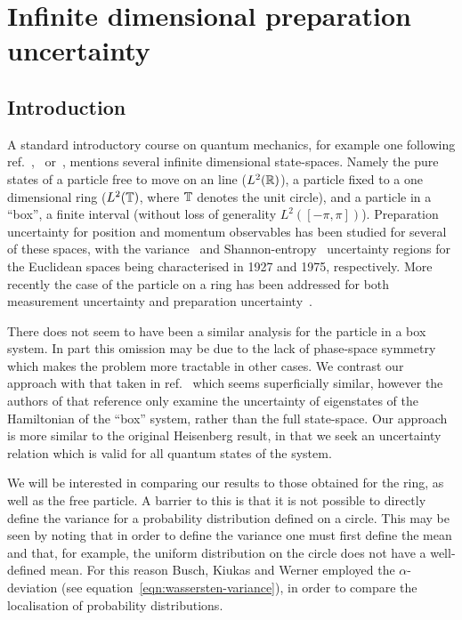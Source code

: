 \chapter{Infinite dimensional preparation uncertainty}\label{chap:infinite-prep-ur}
\section{Introduction}
A standard introductory course on quantum mechanics, for example one following ref.~\cite{griffiths2005introduction},~\cite{Zettili} or~\cite{Shankar}, mentions several infinite dimensional state-spaces. Namely the pure states of a particle free to move on an line ($L^2(\mathbb{R})$), a particle fixed to a one dimensional ring ($L^2(\mathbb{T})$, where $\mathbb{T}$ denotes the unit circle), and a particle in a ``box'', a finite interval (without loss of generality $L^2([-\pi, \pi])$). Preparation uncertainty for position and momentum observables has been studied for several of these spaces, with the variance~\cite{Heisenberg1927-Wheeler+Zurek} and Shannon-entropy~\cites{Bialynicki-BirulaMycielski1975}{beckner-1975} uncertainty regions for the Euclidean spaces being characterised in 1927 and 1975, respectively. More recently the case of the particle on a ring has been addressed for both measurement uncertainty and preparation uncertainty~\cite{sharp-ur-num-angle}. 

There does not seem to have been a similar analysis for the particle in a box system. In part this omission may be due to the lack of phase-space symmetry which makes the problem more tractable in other cases. We contrast our approach with that taken in ref.~\cite{entropic-ur-infinite-well} which seems superficially similar, however the authors of that reference only examine the uncertainty of eigenstates of the Hamiltonian of the ``box'' system, rather than the full state-space. Our approach is more similar to the original Heisenberg result, in that we seek an uncertainty relation which is valid for all quantum states of the system.

We will be interested in comparing our results to those obtained for the ring, as well as the free particle. A barrier to this is that it is not possible to directly define the variance for a probability distribution defined on a circle. This may be seen by noting that in order to define the variance one must first define the mean and that, for example, the uniform distribution on the circle does not have a well-defined mean. For this reason Busch, Kiukas and Werner employed the  $\alpha$-deviation (see equation~\eqref{eqn:wassersten-variance}), in order to compare the localisation of probability distributions. 

